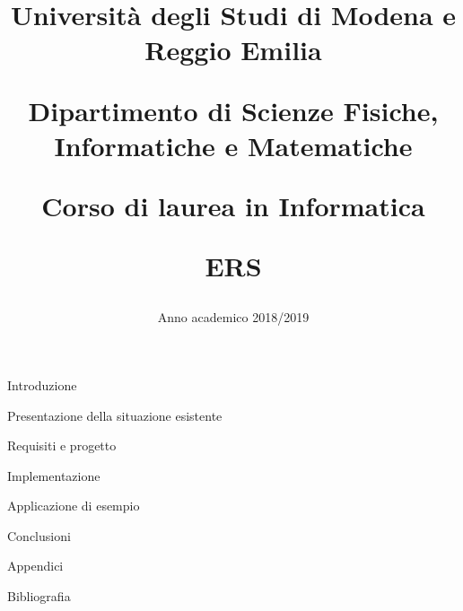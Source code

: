 \documentclass[12pt]{article}
\author{}
\title{
    \huge 
        \textbf{Università degli Studi di Modena e Reggio Emilia}
    \large
        \par Dipartimento di Scienze Fisiche, Informatiche e Matematiche
        \par Corso di laurea in Informatica
    \vfil
        \huge \par \textbf{ERS}
    \vfil
}
\date{Anno academico 2018/2019}
\begin{document}
    \maketitle
    \par Introduzione
    \par Presentazione della situazione esistente
    \par Requisiti e progetto
    \par Implementazione
    \par Applicazione di esempio
    \par Conclusioni
    \par Appendici
    \par Bibliografia
\end{document}
